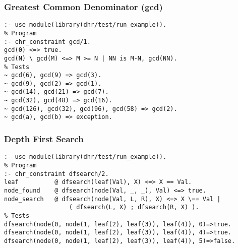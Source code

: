 \subsubsection{Greatest Common Denominator (gcd)}

\begin{lstlisting}[frame=single, caption=test file for the greatest common denominator chr program, label={lst:test:gcd}]
:- use_module(library(dhr/test/run_example)).
% Program
:- chr_constraint gcd/1.
gcd(0) <=> true.
gcd(N) \ gcd(M) <=> M >= N | NN is M-N, gcd(NN).
% Tests
~ gcd(6), gcd(9) => gcd(3).
~ gcd(9), gcd(2) => gcd(1).
~ gcd(14), gcd(21) => gcd(7).
~ gcd(32), gcd(48) => gcd(16).
~ gcd(126), gcd(32), gcd(96), gcd(58) => gcd(2).
~ gcd(a), gcd(b) => exception.
\end{lstlisting}

\subsubsection{Depth First Search}

\begin{lstlisting}[frame=single, caption=test file for a depth first search chr program, label={lst:test:dfsearch}]
:- use_module(library(dhr/test/run_example)).
% Program
:- chr_constraint dfsearch/2.
leaf          @ dfsearch(leaf(Val), X) <=> X == Val.
node_found    @ dfsearch(node(Val, _, _), Val) <=> true.
node_search   @ dfsearch(node(Val, L, R), X) <=> X \== Val |
                  ( dfsearch(L, X) ; dfsearch(R, X) ).
% Tests
dfsearch(node(0, node(1, leaf(2), leaf(3)), leaf(4)), 0)=>true.
dfsearch(node(0, node(1, leaf(2), leaf(3)), leaf(4)), 4)=>true.
dfsearch(node(0, node(1, leaf(2), leaf(3)), leaf(4)), 5)=>false.
\end{lstlisting}

\newpage